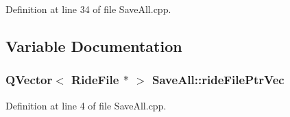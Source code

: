 Definition at line 34 of file Save\-All.\-cpp.



\subsection{Variable Documentation}
\hypertarget{namespace_save_all_a683cd764fde42d76fc00478beb609f06}{
\subsubsection[{ride\-File\-Ptr\-Vec}]{\setlength{\rightskip}{0pt plus 5cm}Q\-Vector$<$ {\bf Ride\-File} $\ast$ $>$ Save\-All\-::ride\-File\-Ptr\-Vec}}\label{namespace_save_all_a683cd764fde42d76fc00478beb609f06}


Definition at line 4 of file Save\-All.\-cpp.

